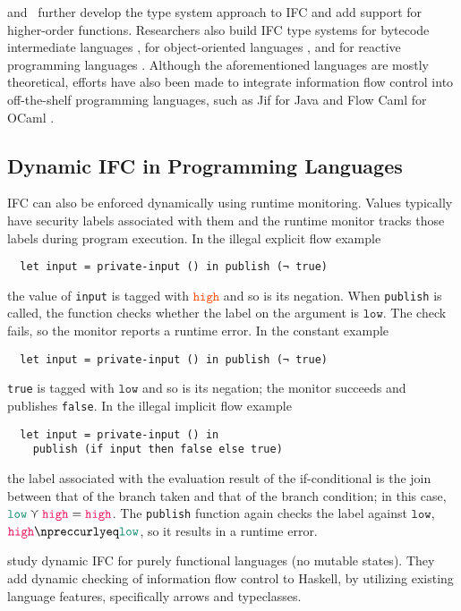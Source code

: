 \documentclass[10pt, letterpaper]{article}
\newcommand{\key}[1]{\ensuremath{\mathtt{#1}}}
\newcommand{\high}{\textcolor{OrangeRed}{\key{high}}\xspace}
\newcommand{\low}{\textcolor{PineGreen}{\key{low}}\xspace}
\begin{document}
\citet{heintze1998slam} and~\citet{zdancewic2002programming} further
develop the type system approach to IFC and add support for higher-order
functions. Researchers also build IFC type systems for bytecode intermediate
languages \citep{barthe2005non}, for object-oriented languages
\citep{amtoft2006logic}, and for reactive programming languages
\citep{bohannon2009reactive}. Although the aforementioned languages are
mostly theoretical, efforts have also been made to integrate information flow
control into off-the-shelf programming languages, such as Jif for Java
\citep{myers1999jflow} and Flow Caml for OCaml
\citep{pottier2002information, simonet2003flow}.

\subsection{Dynamic IFC in Programming Languages}
\label{sec:intro-dyn-ifc}

IFC can also be enforced dynamically using runtime monitoring. Values typically
have security labels associated with them and the runtime monitor tracks those
labels during program execution. In the illegal explicit flow example
\begin{verbatim}
  let input = private-input () in publish (¬ true)
\end{verbatim}
the value of \texttt{input} is tagged with \high and so is its negation. When
\texttt{publish} is called, the function checks whether the label on the
argument is \low. The check fails, so the monitor reports a runtime error. In
the constant example
\begin{verbatim}
  let input = private-input () in publish (¬ true)
\end{verbatim}
\texttt{true} is tagged with \low and so is its negation; the monitor succeeds
and publishes \texttt{false}. In the illegal implicit flow example
\begin{verbatim}
  let input = private-input () in
    publish (if input then false else true)
\end{verbatim}
the label associated with the evaluation result of the if-conditional is the
join between that of the branch taken and that of the branch condition; in this
case, $\low \curlyvee \high = \high$. The \texttt{publish} function again checks
the label against \low, $\high \npreccurlyeq \low$, so it results in a runtime
error.

\citet{li2006encoding,LI20101974} study dynamic IFC for purely functional
languages (no mutable states). They add dynamic checking of information flow
control to Haskell, by utilizing existing language features, specifically arrows
and typeclasses.
\end{document}
